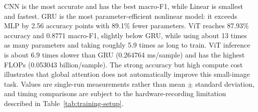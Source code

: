 CNN is the most accurate and has the best macro-F1, while Linear is smallest and fastest. GRU is the most parameter-efficient nonlinear model: it exceeds MLP by 2.56 accuracy points with 89.1\% fewer parameters. ViT reaches 87.93\% accuracy and 0.8771 macro-F1, slightly below GRU, while using about 13 times as many parameters and taking roughly 5.9 times as long to train. ViT inference is about 6.9 times slower than GRU (0.264764 ms/sample) and has the highest FLOPs (0.053043 billion/sample). The strong accuracy but high compute cost illustrates that global attention does not automatically improve this small-image task. Values are single-run measurements rather than mean $\pm$ standard deviation, and timing comparisons are subject to the hardware-recording limitation described in Table~\ref{tab:training-setup}.
